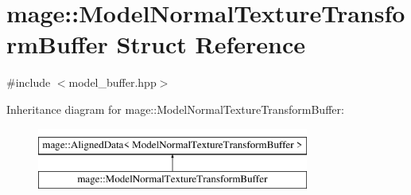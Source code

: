 \hypertarget{structmage_1_1_model_normal_texture_transform_buffer}{}\section{mage\+:\+:Model\+Normal\+Texture\+Transform\+Buffer Struct Reference}
\label{structmage_1_1_model_normal_texture_transform_buffer}


{\ttfamily \#include $<$model\+\_\+buffer.\+hpp$>$}

Inheritance diagram for mage\+:\+:Model\+Normal\+Texture\+Transform\+Buffer\+:\begin{figure}[H]
\begin{center}
\leavevmode
\includegraphics[height=2.000000cm]{structmage_1_1_model_normal_texture_transform_buffer}
\end{center}
\end{figure}
